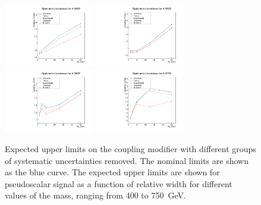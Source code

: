 \begin{figure}[!Hhtb]
\centering
\includegraphics[width=0.35\textwidth,keepaspectratio=true]{fig/app5/breakdowns/generic_breakdown_A_M400.pdf}
\includegraphics[width=0.35\textwidth,keepaspectratio=true]{fig/app5/breakdowns/generic_breakdown_A_M500.pdf}
\includegraphics[width=0.35\textwidth,keepaspectratio=true]{fig/app5/breakdowns/generic_breakdown_A_M600.pdf}
\includegraphics[width=0.35\textwidth,keepaspectratio=true]{fig/app5/breakdowns/generic_breakdown_A_M750.pdf}
\caption{Expected upper limits on the coupling modifier with different groups of systematic uncertainties removed. The nominal limits are shown as the blue curve. The expected upper limits are shown for pseudoscalar signal as a function of relative width for different values of the mass, ranging from 400 to 750~GeV.}
\label{fig:breakdown_amass}
\end{figure}


